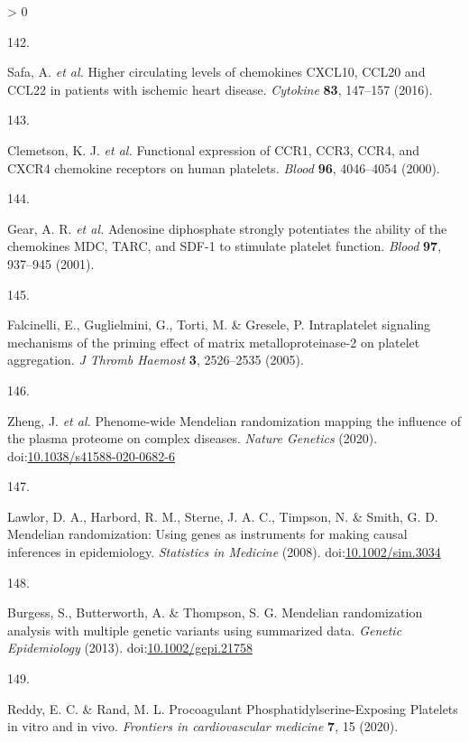 \documentclass[11pt,twoside]{bristolthesis}
\newlength{\cslhangindent}
\newlength{\csllabelwidth}
\newenvironment{CSLReferences}[2] %
 {%
  \setlength{\parindent}{0pt}
  \ifodd #1 \everypar{\setlength{\hangindent}{\cslhangindent}}\ignorespaces\fi
  \ifnum #2 > 0
  \setlength{\parskip}{#2\baselineskip}
  \fi
 }%
 {}
\newcommand{\CSLLeftMargin}[1]{\parbox[t]{\csllabelwidth}{#1}}
\newcommand{\CSLRightInline}[1]{\parbox[t]{\linewidth - \csllabelwidth}{#1}\break}
\begin{document}
\begin{CSLReferences}{0}{0}
\leavevmode\hypertarget{ref-Safa2016}{}%
\CSLLeftMargin{142. }
\CSLRightInline{Safa, A. \emph{et al.} {Higher circulating levels of chemokines CXCL10, CCL20 and CCL22 in patients with ischemic heart disease}. \emph{Cytokine} \textbf{83}, 147--157 (2016).}

\leavevmode\hypertarget{ref-Clemetson2000}{}%
\CSLLeftMargin{143. }
\CSLRightInline{Clemetson, K. J. \emph{et al.} {Functional expression of CCR1, CCR3, CCR4, and CXCR4 chemokine receptors on human platelets}. \emph{Blood} \textbf{96}, 4046--4054 (2000).}

\leavevmode\hypertarget{ref-Gear2001}{}%
\CSLLeftMargin{144. }
\CSLRightInline{Gear, A. R. \emph{et al.} {Adenosine diphosphate strongly potentiates the ability of the chemokines MDC, TARC, and SDF-1 to stimulate platelet function}. \emph{Blood} \textbf{97}, 937--945 (2001).}

\leavevmode\hypertarget{ref-Falcinelli2005}{}%
\CSLLeftMargin{145. }
\CSLRightInline{Falcinelli, E., Guglielmini, G., Torti, M. \& Gresele, P. {Intraplatelet signaling mechanisms of the priming effect of matrix metalloproteinase-2 on platelet aggregation}. \emph{J Thromb Haemost} \textbf{3}, 2526--2535 (2005).}

\leavevmode\hypertarget{ref-Zheng2020}{}%
\CSLLeftMargin{146. }
\CSLRightInline{Zheng, J. \emph{et al.} {Phenome-wide Mendelian randomization mapping the influence of the plasma proteome on complex diseases}. \emph{Nature Genetics} (2020). doi:\href{https://doi.org/10.1038/s41588-020-0682-6}{10.1038/s41588-020-0682-6}}

\leavevmode\hypertarget{ref-Lawlor2008}{}%
\CSLLeftMargin{147. }
\CSLRightInline{Lawlor, D. A., Harbord, R. M., Sterne, J. A. C., Timpson, N. \& Smith, G. D. {Mendelian randomization: Using genes as instruments for making causal inferences in epidemiology}. \emph{Statistics in Medicine} (2008). doi:\href{https://doi.org/10.1002/sim.3034}{10.1002/sim.3034}}

\leavevmode\hypertarget{ref-Burgess2013}{}%
\CSLLeftMargin{148. }
\CSLRightInline{Burgess, S., Butterworth, A. \& Thompson, S. G. {Mendelian randomization analysis with multiple genetic variants using summarized data}. \emph{Genetic Epidemiology} (2013). doi:\href{https://doi.org/10.1002/gepi.21758}{10.1002/gepi.21758}}

\leavevmode\hypertarget{ref-Reddy2020}{}%
\CSLLeftMargin{149. }
\CSLRightInline{Reddy, E. C. \& Rand, M. L. {Procoagulant Phosphatidylserine-Exposing Platelets in vitro and in vivo}. \emph{Frontiers in cardiovascular medicine} \textbf{7}, 15 (2020).}


\end{CSLReferences}
\end{document}
